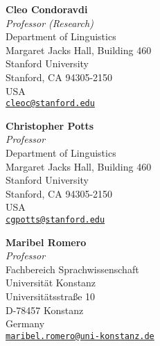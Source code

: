 {}
%
	 \unindent\textbf{Cleo Condoravdi}\\
	 \unindent		\textit{Professor (Research)}\\
	 \unindent		Department of Linguistics\\
	 \unindent		Margaret Jacks Hall, Building 460\\
	 \unindent		Stanford University \\
	 \unindent		Stanford, CA 94305-2150\\
	 \unindent		USA\\
	 \unindent		\href{cleoc@stanford.edu}{\texttt{cleoc@stanford.edu}}
	 
	\vspace{1.5em}
		\unindent \textbf{Christopher Potts}\\
		\unindent \textit{Professor}\\
		\unindent Department of Linguistics\\
		\unindent Margaret Jacks Hall, Building 460\\
		\unindent Stanford University \\
		\unindent Stanford, CA 94305-2150\\
		\unindent USA\\
		\unindent \href{cgpotts@stanford.edu}{\texttt{cgpotts@stanford.edu}}
	
	
	\vspace{1.5em}
		
\unindent		\textbf{Maribel Romero}\\
\unindent		\textit{Professor}\\
\unindent		Fachbereich Sprachwissenschaft\\
\unindent	Universit\"at Konstanz\\
\unindent		Universit\"atsstra\ss{}e 10\\
\unindent		D-78457 Konstanz\\
\unindent		Germany \\
	  \unindent\href{mailto:maribel.romero@uni-konstanz.de}{\texttt{maribel.romero@uni-konstanz.de}}
	
